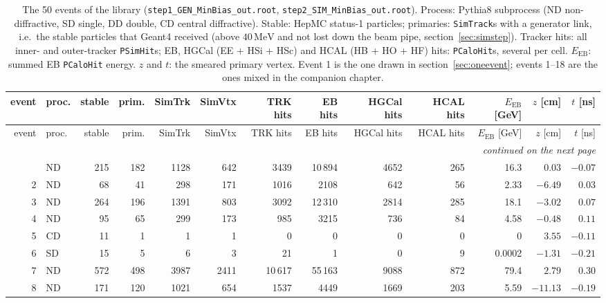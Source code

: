 \documentclass[11pt,a4paper]{article}
\newcommand{\code}[1]{\texttt{#1}}
\newcommand{\MeV}{\,\mathrm{MeV}}
\begin{document}
\begingroup
\scriptsize
\setlength{\tabcolsep}{2pt}
\renewcommand{\arraystretch}{1.02}
\begin{longtable}{rlrrrrrrrrrrr}
\caption{The 50 events of the library (\code{step1\_GEN\_MinBias\_out.root}, \code{step2\_SIM\_MinBias\_out.root}).
Process: Pythia8 subprocess (ND non-diffractive, SD single, DD double, CD central diffractive). Stable: HepMC
status-1 particles; primaries: \code{SimTrack}s with a generator link, i.e.\ the stable particles that
Geant4 received (above $40\MeV$ and not lost down the beam pipe, section~\ref{sec:simstep}). Tracker hits: all inner- and outer-tracker
\code{PSimHit}s; EB, HGCal (EE + HSi + HSc) and HCAL (HB + HO + HF) hits: \code{PCaloHit}s, several per
cell. $E_{\mathrm{EB}}$: summed EB \code{PCaloHit} energy. $z$ and $t$: the smeared primary vertex. Event 1 is
the one drawn in section~\ref{sec:oneevent}; events 1--18 are the ones mixed in the companion chapter.}
\label{tab:events}\\
\toprule
event & proc. & stable & prim. & SimTrk & SimVtx & TRK hits & EB hits & HGCal hits & HCAL hits & $E_{\mathrm{EB}}$ [GeV] & $z$ [cm] & $t$ [ns] \\
\midrule
\endfirsthead
\toprule
event & proc. & stable & prim. & SimTrk & SimVtx & TRK hits & EB hits & HGCal hits & HCAL hits & $E_{\mathrm{EB}}$ [GeV] & $z$ [cm] & $t$ [ns] \\
\midrule
\endhead
\midrule \multicolumn{13}{r}{\emph{continued on the next page}} \\
\endfoot
\bottomrule
\endlastfoot
 1 & ND & 215 & 182 & 1128 &  642 &  3439 & 10\,894 &  4652 &  265 & 16.3  &  $0.03$ & $-0.07$ \\
 2 & ND &  68 &  41 &  298 &  171 &  1016 &  2108 &   642 &   56 &  2.33 & $-6.49$ &  $0.03$ \\
 3 & ND & 264 & 196 & 1391 &  803 &  3092 & 12\,310 &  2814 &  285 & 18.1  & $-3.02$ &  $0.07$ \\
 4 & ND &  95 &  65 &  299 &  173 &   985 &  3215 &   736 &   84 &  4.58 & $-0.48$ &  $0.11$ \\
 5 & CD &  11 &   1 &    1 &    1 &     0 &     0 &     0 &    0 &  0    &  $3.55$ & $-0.11$ \\
 6 & SD &  15 &   5 &    6 &    3 &    21 &     1 &     0 &    9 &  0.0002 & $-1.31$ & $-0.21$ \\
 7 & ND & 572 & 498 & 3987 & 2411 & 10\,617 & 55\,163 &  9088 &  872 & 79.4  &  $2.79$ &  $0.30$ \\
 8 & ND & 171 & 120 & 1021 &  654 &  1537 &  4449 &  1669 &  203 &  5.59 & $-11.13$ & $-0.19$ \\

\end{longtable}
\end{document}
